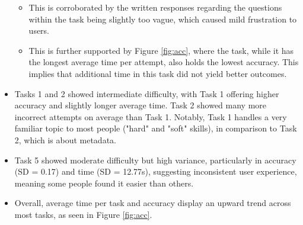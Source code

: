 \begin{itemize}
\begin{itemize}
\begin{figure}[hbtp]
\end{figure}
            \item This is corroborated by the written responses regarding the questions within the task being slightly too vague, which caused mild frustration to users. 
            \item This is further supported by Figure \ref{fig:acc}, where the task, while it has the longest average time per attempt, also holds the lowest accuracy. 
            This implies that additional time in this task did not yield better outcomes.
        \end{itemize}
        \item Tasks 1 and 2 showed intermediate difficulty, with Task 1 offering higher accuracy and slightly longer average time. 
        Task 2 showed many more incorrect attempts on average than Task 1. 
        Notably, Task 1 handles a very familiar topic to most people ("hard" and "soft" skills), in comparison to Task 2, which is about metadata. 
        \item Task 5 showed moderate difficulty but high variance, particularly in accuracy (SD = 0.17) and time (SD = 12.77s), suggesting inconsistent user experience, meaning some people found it easier than others.
        \item Overall, average time per task and accuracy display an upward trend across most tasks, as seen in Figure \ref{fig:acc}.
\end{itemize}

